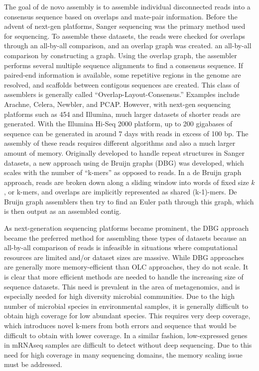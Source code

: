 \documentclass[12pt]{article} \usepackage{simplemargins}
\begin{document}
The goal of de novo assembly is to assemble individual disconnected
reads into a consensus sequence based on overlaps and mate-pair
information. Before the advent of next-gen platforms, Sanger
sequencing was the primary method used for sequencing. To assemble 
these datasets, the reads were checked for overlaps through an 
all-by-all comparison, and an overlap graph was created.
an all-by-all comparison by constructing a graph\cite{assemblyreview}.
Using the overlap graph, the assembler 
performs several multiple sequence alignments to find a consensus sequence. 
If paired-end information is available, some repetitive regions in the 
genome are resolved, and scaffolds between contigous sequences are 
created. This class of assemblers is generally called 
``Overlap-Layout-Consensus.'' Examples include
Arachne\cite{arachne}, Celera\cite{celera}, Newbler\cite{newbler}, and 
PCAP\cite{pcap}. However, with next-gen sequencing 
platforms such as 454 and Illumina, much larger datasets of shorter reads 
are generated. With the Illumina Hi-Seq 2000 platform, up to 200 
gigabases of sequence can be generated 
in around 7 days with reads in excess of 100 bp. The assembly of 
these reads requires different
algorithms and also a much larger amount of memory. Originally developed to 
handle repeat structures in Sanger datasets, a new approach using de Bruijn 
graphs (DBG) was developed\cite{pmid11504945}, which scales with the number 
of ``k-mers'' as opposed to reads.
In a de Bruijn
graph approach, reads are broken down along a sliding window into words of fixed
size $k$, or k-mers, and overlaps are implicitly represented as shared (k-1)-mers.
De Bruijn graph assemblers then try to find an Euler path through
this graph, which is then output as an assembled contig\cite{assemblyreview}.

As next-generation sequencing platforms became prominent, the DBG approach
became the preferred method for assembling these types of datasets
because an all-by-all comparison of reads is infeasible in situations where 
computational resources are limited and/or dataset sizes are massive. While DBG
approaches are generally more memory-efficient than OLC approaches,
they do not scale.  It
is clear that more efficient methods are needed to handle the
increasing size of sequence datasets. This need is
prevalent in the area of metagenomics, and is especially
needed for high diversity
microbial communities. Due to the high number of microbial species 
in environmental samples, it is generally difficult to obtain high coverage 
for low abundant species. This 
requires very deep coverage, which introduces novel k-mers from both 
errors and sequence that 
would be difficult to obtain with lower coverage. In a similar fashion, 
low-expressed genes in mRNAseq samples are difficult to detect without deep 
sequencing. Due to this need for high coverage in many sequencing 
domains, the memory scaling issue must be addressed.
\end{document}
